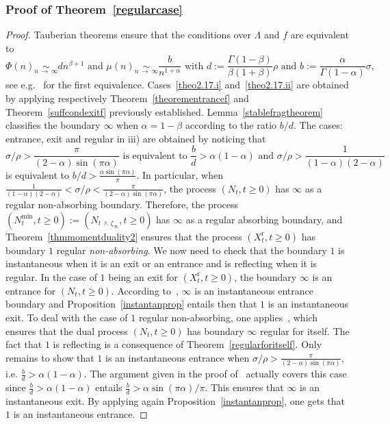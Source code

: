 \documentclass[AHL,Unicode,longabstracts,published]{cedram}
\newcommand{\rmr}{\mathrm{r}}
\begin{document}
\subsubsection{Proof of Theorem~\ref{regularcase}}
\begin{proof}
Tauberian theorems ensure that the conditions over $\Lambda$ and $f$ are equivalent to
\[
\Phi(n)\underset{n\,\rightarrow\,\infty}{\sim} d n^{\beta+1}
\text{ and }
\mu(n)\underset{n\,\rightarrow\,\infty}{\sim} \frac{b}{n^{1+\alpha}}\text{ with }d:=\frac{\Gamma(1-\beta)}{\beta(1+\beta)}\rho \text{ and } b:=\frac{\alpha}{\Gamma(1-\alpha)}\sigma,
\]
see e.g.~\cite[Section~2.2, p.~12]{cdiEFC} for the first equivalence. Cases~\eqref{theo2.17.i} and~\eqref{theo2.17.ii} are obtained by applying respectively Theorem~\ref{theorementrancef} and Theorem~\ref{suffcondexitf} previously established. Lemma~\ref{stablefragtheorem} classifies the boundary $\infty$ when $\alpha=1-\beta$ according to the ratio $b/d$. The cases: entrance, exit and regular in iii) are obtained by noticing that
\[
\sigma/\rho>\frac{\pi}{(2-\alpha)\sin(\pi \alpha)}\text{ is equivalent to }\frac{b}{d}>\alpha(1-\alpha)\text{ and }\sigma/\rho>\frac{1}{(1-\alpha)(2-\alpha)}
\]
is equivalent to $b/d>\frac{\alpha \sin(\pi \alpha)}{\pi}$. In particular, when $\frac{1}{(1-\alpha)(2-\alpha)}<\sigma/\rho<\frac{\pi}{(2-\alpha)\sin(\pi \alpha)}$, the process $(N_t,t\geq 0)$ has $\infty$ as a regular non-absorbing boundary. Therefore, the process $(N^{\min}_t,t\geq 0):=(N_{t\,\wedge\,\zeta_{\infty}},t\geq 0)$ has $\infty$ as a regular absorbing boundary, and Theorem~\ref{thmmomentduality2} ensures that the process $(X_t^{\rmr},t\geq 0)$ has boundary $1$ regular \emph{non-absorbing}. We now need to check that the boundary $1$ is instantaneous when it is an exit or an entrance and is reflecting when it is regular. In the case of $1$ being an exit for $(X_t^{\rmr},t\geq 0)$, the boundary $\infty$ is an entrance for $(N_t,t\geq 0)$. According to~\cite[Lemma~2.5]{cdiEFC}, $\infty$ is an instantaneous entrance boundary and Proposition~\ref{instantanprop} entails then that $1$ is an instantaneous exit. To deal with the case of $1$ regular non-absorbing, one applies~\cite[Proposition~3.7]{explosion}, which ensures that the dual process $(N_t,t\geq 0)$ has boundary $\infty$ regular for itself. The fact that $1$ is reflecting is a consequence of Theorem~\ref{regularforitself}. Only remains to show that $1$ is an instantaneous entrance when $\sigma/\rho>\frac{\pi}{(2-\alpha)\sin(\pi \alpha)}$, i.e. $\frac{b}{d}>\alpha(1-\alpha)$. The argument given in the proof of~\cite[Proposition~3.7]{explosion} actually covers this case since $\frac{b}{d}>\alpha(1-\alpha)$ entails $\frac{b}{d}>\alpha \sin(\pi \alpha)/\pi$. This ensures that $\infty$ is an instantaneous exit. By applying again Proposition~\ref{instantanprop}, one gets that $1$ is an instantaneous entrance.
\end{proof}
\end{document}
